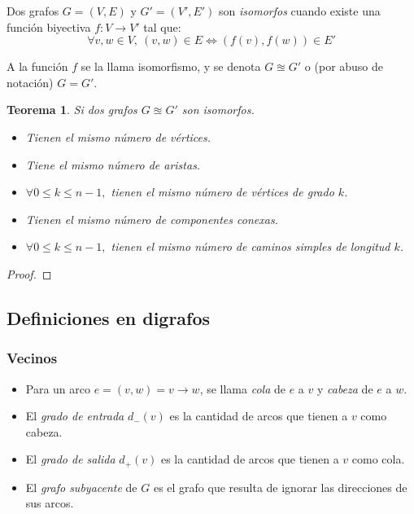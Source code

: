 \documentclass[a4paper]{report}
\newtheorem*{theorem*}{Teorema}
\begin{document}
Dos grafos $G = (V, E)$ y $G' = (V', E')$ son \textit{isomorfos} cuando existe una función biyectiva $f: V \longrightarrow V'$ tal que:
$$\forall v, w \in V,\ (v, w) \in E \iff (f(v), f(w)) \in E'$$

A la función $f$ se la llama isomorfismo, y se denota $G \approxeq G'$ o (por abuso de notación) $G = G'$.

\begin{theorem*}
    Si dos grafos $G \approxeq G'$ son isomorfos.
    \begin{itemize}
        \item Tienen el mismo número de vértices.
        \item Tiene el mismo número de aristas.
        \item $\forall 0 \leq k \leq n - 1,$ tienen el mismo número de vértices de grado $k$.
        \item Tienen el mismo número de componentes conexas.
        \item $\forall 0 \leq k \leq n - 1,$ tienen el mismo número de caminos simples de longitud $k$.
    \end{itemize}
\end{theorem*}
\begin{proof}

\end{proof}

\subsection{Definiciones en digrafos}

\subsubsection{Vecinos}

\begin{itemize}
    \item Para un arco $e = (v, w) = v \rightarrow w$, se llama \textit{cola} de $e$ a $v$ y \textit{cabeza} de $e$ a $w$.
    \item El \textit{grado de entrada} $d_-(v)$ es la cantidad de arcos que tienen a $v$ como cabeza.
    \item El \textit{grado de salida} $d_+(v)$ es la cantidad de arcos que tienen a $v$ como cola.
    \item El \textit{grafo subyacente} de $G$ es el grafo que resulta de ignorar las direcciones de sus arcos.
\end{itemize}
\end{document}
